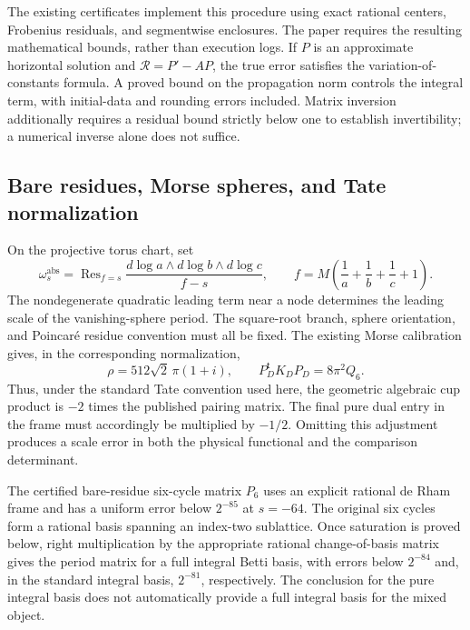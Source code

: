 \documentclass[11pt,a4paper,oneside]{article}
\theoremstyle{plain}
\theoremstyle{definition}
\theoremstyle{remark}
\newcommand{\Res}{\operatorname{Res}}
\numberwithin{equation}{section}
\begin{document}
The existing certificates implement this procedure using exact rational centers, Frobenius residuals, and segmentwise enclosures. The paper requires the resulting mathematical bounds, rather than execution logs. If $P$ is an approximate horizontal solution and $\mathcal R=P'-AP$, the true error satisfies the variation-of-constants formula. A proved bound on the propagation norm controls the integral term, with initial-data and rounding errors included. Matrix inversion additionally requires a residual bound strictly below one to establish invertibility; a numerical inverse alone does not suffice.


\subsection{Bare residues, Morse spheres, and Tate normalization}
On the projective torus chart, set
\begin{equation}
 \omega_s^{\mathrm{abs}}=\Res_{f=s}
 \frac{d\log a\wedge d\log b\wedge d\log c}{f-s},\qquad
 f=M\left(\frac1a+\frac1b+\frac1c+1\right).
\end{equation}
The nondegenerate quadratic leading term near a node determines the leading scale of the vanishing-sphere period. The square-root branch, sphere orientation, and Poincaré residue convention must all be fixed. The existing Morse calibration gives, in the corresponding normalization,
\begin{equation}
 \rho=512\sqrt2\,\pi(1+i),\qquad
 P_D^{\mathsf t}K_DP_D=8\pi^2Q_6.
\end{equation}
Thus, under the standard Tate convention used here, the geometric algebraic cup product is $-2$ times the published pairing matrix. The final pure dual entry in the frame must accordingly be multiplied by $-1/2$. Omitting this adjustment produces a scale error in both the physical functional and the comparison determinant.

The certified bare-residue six-cycle matrix $P_6$ uses an explicit rational de Rham frame and has a uniform error below $2^{-85}$ at $s=-64$. The original six cycles form a rational basis spanning an index-two sublattice. Once saturation is proved below, right multiplication by the appropriate rational change-of-basis matrix gives the period matrix for a full integral Betti basis, with errors below $2^{-84}$ and, in the standard integral basis, $2^{-81}$, respectively. The conclusion for the pure integral basis does not automatically provide a full integral basis for the mixed object.
\end{document}
